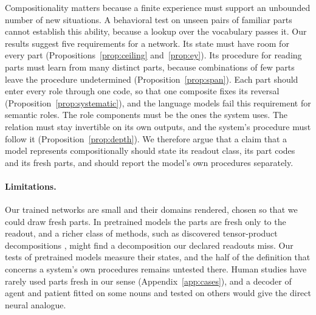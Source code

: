 Compositionality matters because a finite experience must support an unbounded number of new situations. A behavioral test on unseen pairs of familiar parts cannot establish this ability, because a lookup over the vocabulary passes it. Our results suggest five requirements for a network. Its state must have room for every part (Propositions~\ref{prop:ceiling} and~\ref{prop:ey}). Its procedure for reading parts must learn from many distinct parts, because combinations of few parts leave the procedure undetermined (Proposition~\ref{prop:span}). Each part should enter every role through one code, so that one composite fixes its reversal (Proposition~\ref{prop:systematic}), and the language models fail this requirement for semantic roles. The role components must be the ones the system uses. The relation must stay invertible on its own outputs, and the system's procedure must follow it (Proposition~\ref{prop:depth}). We therefore argue that a claim that a model represents compositionally should state its readout class, its part codes and its fresh parts, and should report the model's own procedures separately.

\paragraph{Limitations.} Our trained networks are small and their domains rendered, chosen so that we could draw fresh parts. In pretrained models the parts are fresh only to the readout, and a richer class of methods, such as discovered tensor-product decompositions \citep{soulos2020}, might find a decomposition our declared readouts miss. Our tests of pretrained models measure their states, and the half of the definition that concerns a system's own procedures remains untested there. Human studies have rarely used parts fresh in our sense (Appendix~\ref{app:cases}), and a decoder of agent and patient \citep{frankland2015} fitted on some nouns and tested on others would give the direct neural analogue.
